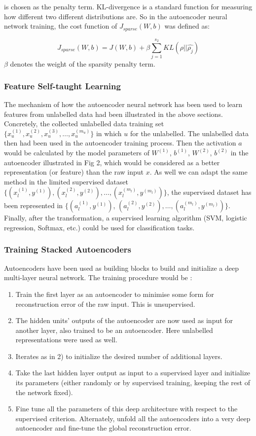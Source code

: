 \documentclass[journal]{IEEEtran}
\begin{document}
\noindent is chosen as the  penalty term. KL-divergence is a standard function for measuring how different two different distributions are. So in the autoencoder neural network training, the cost function of $J_{sparse}(W,b)$ was defined as:

\begin{equation}
J_{sparse}(W,b) = J(W,b) + \beta \sum_{j=1}^{s_2}KL(\rho||\hat{\rho_j})
\end{equation}
\noindent $\beta$ denotes the weight of the sparsity penalty term.

\subsubsection{Feature Self-taught Learning}
The mechanism of how the autoencoder neural network has been used to learn features from unlabelled data had been illustrated in the above sections. Concretely, the collected unlabelled data training set $\{{x_u^{(1)}, x_u^{(2)}, x_u^{(3)}, \ldots, x_u^{(m_u)} }\}$ in which $u$ for the unlabelled. The unlabelled data then had been used in the autoencoder training process. Then the activation $a$ would be calculated by the model parameters of $W^{(1)}$, $b^{(1)}$, $W^{(2)}$, $b^{(2)}$ in the autoencoder illustrated in Fig 2, which would be considered as a better representation (or feature) than the raw input $x$. As well we can adapt the same method in the limited supervised dataset $\{(x_l^{(1)}, y^{(1)}), (x_l^{(2)}, y^{(2)}), \ldots, (x_l^{(m_l)}, y^{(m_l)})\}$,  the supervised dataset has been represented in $\{(a_l^{(1)}, y^{(1)})$, $(a_l^{(2)}, y^{(2)}), \ldots, (a_l^{(m_l)}, y^{(m_l)}) \}$. Finally, after the transformation, a supervised learning algorithm (SVM, logistic regression, Softmax, etc.) could be used for classification tasks. 

\subsubsection{Training Stacked Autoencoders}
Autoencoders have been used as building blocks to build and initialize a deep multi-layer neural network. The training procedure would be \cite{bengio2009}:
\begin{enumerate}
\item Train the first layer as an autoencoder to minimise some form for reconstruction error of the raw input. This is unsupervised.
\item The hidden units' outputs of the autoencoder are now used as input for another layer, also trained to be an autoencoder. Here unlabelled representations were used as well.
\item Iterates as in 2) to initialize the desired number of additional layers.
\item Take the last hidden layer output as input to a supervised layer and initialize its parameters (either randomly or by supervised training, keeping the rest of the network fixed).
\item Fine tune all the parameters of this deep architecture with respect to the supervised criterion. Alternately, unfold all the autoencoders into a very deep autoencoder and fine-tune the global reconstruction error.
\end{enumerate}
\end{document}
